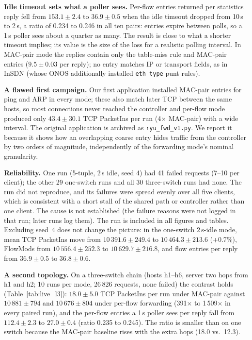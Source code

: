 \textbf{Idle timeout sets what a poller sees.} Per-flow entries returned per statistics reply fell from $153.1\pm2.4$
to $36.9\pm0.5$ when the idle timeout dropped from 10\,s to 2\,s, a ratio of 0.234 to 0.246 in all ten pairs: entries
expire between polls, so a 1\,s poller sees about a quarter as many. The result is close to what a shorter timeout
implies; its value is the size of the loss for a realistic polling interval. In MAC-pair mode the replies contain only
the table-miss rule and MAC-pair entries ($9.5\pm0.03$ per reply); no entry matches IP or transport fields, as in
InSDN (whose ONOS additionally installed \texttt{eth\_type} punt rules).

\textbf{A flawed first campaign.} Our first application installed MAC-pair entries for ping and ARP in every mode;
these also match later TCP between the same hosts, so most connections never reached the controller and per-flow mode
produced only $43.4\pm30.1$ TCP PacketIns per run (4$\times$ MAC-pair) with a wide interval. The original application
is archived as \texttt{ryu\_fwd\_v1.py}. We report it because it shows how an overlapping coarse entry hides traffic
from the controller by two orders of magnitude, independently of the forwarding mode's nominal granularity.

\textbf{Reliability.} One run (5-tuple, 2\,s idle, seed 4) had 41 failed requests (7--10 per client); the other 29
one-switch runs and all 30 three-switch runs had none. The run did not reproduce, and its failures were spread evenly over
all five clients, which is consistent with a short stall of the shared path or controller rather than one client. The cause
is not established (the failure reasons were not logged in that run; later runs log them). The run is included in all figures
and tables. Excluding seed~4 does not change the picture: in the one-switch 2\,s-idle mode, mean TCP PacketIns move from
$10\,391.6\pm249.4$ to $10\,464.3\pm213.6$ (+0.7\%), FlowMods from $10\,556.4\pm252.3$ to $10\,629.7\pm216.8$, and flow
entries per reply from $36.9\pm0.5$ to $36.8\pm0.6$.

\textbf{A second topology.} On a three-switch chain (hosts h1--h6, server two hops from h1 and h2; 10 runs per mode,
26\,826 requests, none failed) the contrast holds (Table~\ref{tab:live_l3}): $18.0\pm5.0$ TCP PacketIns per run under
MAC-pair against $10\,881\pm794$ and $10\,676\pm804$ under per-flow forwarding (391$\times$ to 1\,509$\times$ in every
paired run), and the per-flow entries a 1\,s poller sees per reply fall from $112.4\pm2.3$ to $27.0\pm0.4$ (ratio 0.235 to
0.245). The ratio is smaller than on one switch because the MAC-pair baseline rises with the extra hops (18.0 vs.\ 12.3).

